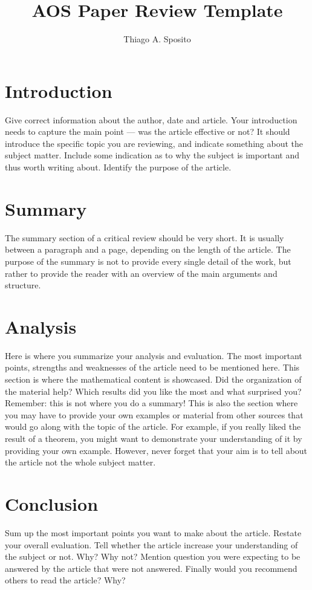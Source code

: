 \documentclass[12pt]{article}
\title{AOS Paper Review Template}
\author{Thiago A. Sposito\inst{1} }
\begin{document}
 

\maketitle


\section{Introduction}

Give correct information about the author, date and article. Your introduction needs to capture the main point --- was the article effective or not? It should introduce the specific topic you are reviewing, and indicate something about the subject matter. Include some indication as to why the subject is important and thus worth writing about. Identify the purpose of the article.


\section{Summary} 

The summary section of a critical review should be very short. It is usually between a paragraph and a page, depending on the length of the article. The purpose of the summary is not to provide every single detail of the work, but rather to provide the reader with an overview of the main arguments and structure.


\section{Analysis}

Here is where you summarize your analysis and evaluation. The most important points, strengths and weaknesses of the article need to be mentioned here. This section is where the mathematical content is showcased. Did the organization of the material help? Which results did you like the most and what surprised you? Remember: this is not where you do a summary! This is also the section where you may have to provide your own examples or material from other sources that would go along with the topic of the article. For example, if you really liked the result of a theorem, you might want to demonstrate your understanding of it by providing your own example. However, never forget that your aim is to tell about the article not the whole subject matter.


\section{Conclusion}

Sum up the most important points you want to make about the article. Restate your overall evaluation. Tell whether the article increase your understanding of the subject or not. Why? Why not? Mention question you were expecting to be answered by the article that were not answered. Finally would you recommend others to read the article? Why?




\end{document}
